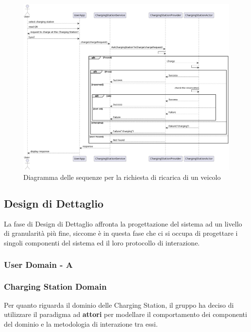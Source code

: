 \begin{figure}[htbp]
    \centering
    \includegraphics[width=\textwidth]{images/charge.png}
    \caption{Diagramma delle sequenze per la richiesta di ricarica di un veicolo}
    \label{fig:charge}
\end{figure}


\subsection{Design di Dettaglio}
La fase di Design di Dettaglio affronta la progettazione del sistema ad un livello di granularità più fine, siccome è in questa fase che ci si occupa di progettare i singoli componenti del sistema ed il loro protocollo di interazione.\\
\subsubsection{User Domain - A}

\subsubsection{Charging Station Domain}
Per quanto riguarda il dominio delle Charging Station, il gruppo ha deciso di utilizzare il paradigma ad \textbf{attori} per modellare il comportamento dei componenti del dominio e la
metodologia di interazione tra essi. \\

